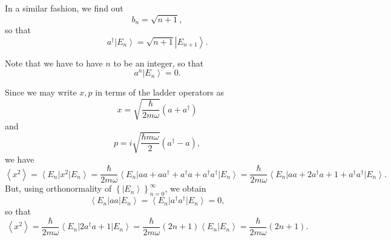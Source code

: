 \documentclass[phys334]{subfiles}
\begin{document}
    In a similar fashion, we find out
    \begin{equation*}
        b_n = \sqrt{n+1},
    \end{equation*}
    so that
    \begin{equation*}
        a^{\dagger}\left| E_n \right\rangle = \sqrt{n+1}\left| E_{n+1} \right\rangle.
    \end{equation*}

    \np Note that we have to have $n$ to be an integer, so that
    \begin{equation*}
        a^n\left| E_n \right\rangle = 0.
    \end{equation*}

    \np Since we may write $x,p$ in terms of the ladder operators as
    \begin{equation*}
        x = \sqrt{\frac{\hbar}{2m\omega}}\left( a+a^{\dagger} \right)
    \end{equation*}
    and
    \begin{equation*}
        p = i\sqrt{\frac{\hbar m\omega}{2}}\left( a^{\dagger}-a \right),
    \end{equation*}
    we have
    \begin{equation*}
        \left< x^{2} \right> = \left\langle E_n \right|x^{2}\left| E_n \right\rangle = \frac{\hbar}{2m\omega} \left\langle E_n \right|aa+aa^{\dagger}+a^{\dagger}a+a^{\dagger}a^{\dagger}\left| E_n \right\rangle = \frac{\hbar}{2m\omega} \left\langle E_n \right|aa+2a^{\dagger}a+1+a^{\dagger}a^{\dagger}\left| E_n \right\rangle.
    \end{equation*}
    But, using orthonormality of $\left\lbrace \left| E_n \right\rangle \right\rbrace^{\infty}_{n=0}$, we obtain
    \begin{equation*}
        \left\langle E_n \right|aa\left| E_n \right\rangle = \left\langle E_n \right|a^{\dagger}a^{\dagger}\left| E_n \right\rangle = 0,
    \end{equation*}
    so that
    \begin{equation*}
        \left< x^{2} \right> = \frac{\hbar}{2m\omega}\left\langle E_n \right|2a^{\dagger}a+1\left| E_n \right\rangle = \frac{\hbar}{2m\omega} \left( 2n+1 \right) \left\langle E_n | E_n \right\rangle = \frac{\hbar}{2m\omega} \left( 2n+1 \right).
    \end{equation*}
\end{document}
